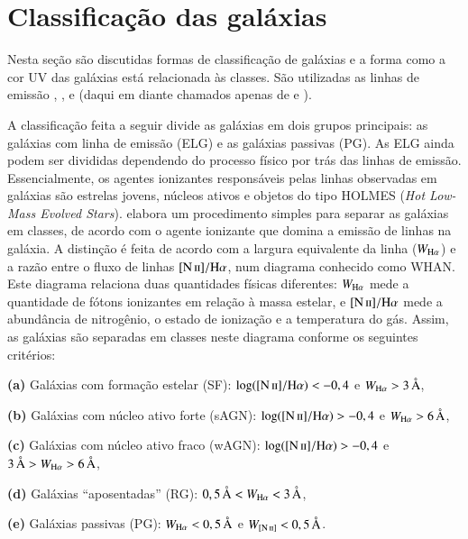 
\section{Classificação das galáxias}

Nesta seção são discutidas formas de classificação de galáxias e a forma como a
cor UV das galáxias está relacionada às classes. São utilizadas as linhas de
emissão \Halpha, \Hbeta, \NII e \OIII (daqui em diante chamados apenas de \nII e
\oIII).

A classificação feita a seguir divide as galáxias em dois grupos principais: as
galáxias com linha de emissão (ELG) e as galáxias passivas (PG). As ELG ainda
podem ser divididas dependendo do processo físico por trás das linhas de
emissão. Essencialmente, os agentes ionizantes responsáveis pelas linhas
observadas em galáxias são estrelas jovens, núcleos ativos e objetos do tipo
HOLMES ({\em Hot Low-Mass Evolved Stars}). \citet{CidFernandes2011} elabora um
procedimento simples para separar as galáxias em classes, de acordo com o agente
ionizante que domina a emissão de linhas na galáxia. A distinção é feita de
acordo com a largura equivalente da linha \Halpha ($\WHa$) e a razão entre o
fluxo de linhas $\nII/\Halpha$, num diagrama conhecido como WHAN. Este diagrama
relaciona duas quantidades físicas diferentes: $\WHa$ mede a quantidade de
fótons ionizantes em relação à massa estelar, e $\nII/\Halpha$ mede a abundância
de nitrogênio, o estado de ionização e a temperatura do gás. Assim, as galáxias
são separadas em classes neste diagrama conforme os seguintes critérios:

\begin{list}{}{\setlength\itemsep{0pt}}
\item \textbf{(a)} Galáxias com formação estelar (SF): $\log(\nII/\Halpha) <
-0,4$ e $\WHa > 3\,\text{\AA}$,
\item \textbf{(b)} Galáxias com núcleo ativo forte (sAGN): $\log(\nII/\Halpha) >
-0,4$ e $\WHa > 6\,\text{\AA}$,
\item \textbf{(c)} Galáxias com núcleo ativo fraco (wAGN): $\log(\nII/\Halpha) >
-0,4$ e $3\,\text{\AA} > \WHa > 6\,\text{\AA}$,
\item \textbf{(d)} Galáxias ``aposentadas'' (RG): $0,5\,\text{\AA} < \WHa <
3\,\text{\AA}$,
\item \textbf{(e)} Galáxias passivas (PG): $\WHa < 0,5\,\text{\AA}$ e $W_{\mathrm{[N\,\textsc{ii}]}} <
0,5\,\text{\AA}$.
\end{list}

